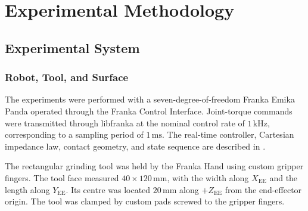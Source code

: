\chapter{Experimental Methodology}
\label{ch:methodology}




\section{Experimental System}
\label{sec:experimental_system}

\subsection{Robot, Tool, and Surface}
\label{subsec:experimental_robot_tool_surface}

The experiments were performed with a seven-degree-of-freedom Franka Emika
Panda operated through the Franka Control Interface. Joint-torque commands were
transmitted through libfranka at the nominal control rate of
\(1\,\mathrm{kHz}\), corresponding to a sampling period of
\(1\,\mathrm{ms}\). The real-time
controller, Cartesian impedance law, contact geometry, and state sequence are
described in .

The rectangular grinding tool was held by the Franka Hand using custom gripper
fingers. The tool face measured \(40\times120\,\mathrm{mm}\), with the
width along \(X_{\mathrm{EE}}\) and the length along \(Y_{\mathrm{EE}}\). Its
centre was located \(20\,\mathrm{mm}\) along \(+Z_{\mathrm{EE}}\) from the
end-effector origin. The tool was clamped by custom pads screwed to
the gripper fingers.

